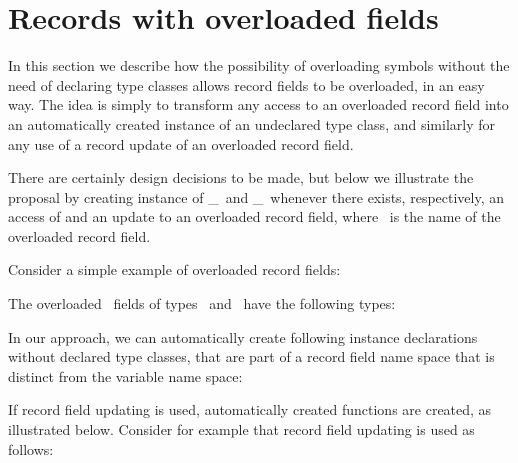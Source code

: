 \section{Records with overloaded fields}
\label{sec:overloaded-record-fields}

In this section we describe how the possibility of overloading symbols
without the need of declaring type classes allows record fields to be
overloaded, in an easy way. The idea is simply to transform any access
to an overloaded record field into an automatically created instance
of an undeclared type class, and similarly for any use of a record
update of an overloaded record field. 

There are certainly design decisions to be made, but below we
illustrate the proposal by creating instance of \get\_\fieldname\ and
\update\_\fieldname\ whenever there exists, respectively, an access of
and an update to an overloaded record field, where \fieldname\ is the
name of the overloaded record field.

Consider a simple example of overloaded record fields: 

\progb{\data\ \Address\ \= = \Address\ \= \{ \id\ :: \Int, \address\ \= :: \String\ \= \kill
\data\ \Person\  \> = \Person\  \> \{ \id\ :: \Int, \name\    \> :: \String\ \>\}\\
\data\ \Address\ \> = \Address\ \> \{ \id\ :: \Int, \address\ \> :: \String\ \>\}
}

The overloaded \id\ fields of types \Person\ and \Address\ have the
following types:

\progb{\id\ :: \Address\ \= \kill
\id\ :: \Person\  \>$\rightarrow$ \Int\\
\id\ :: \Address\ \>$\rightarrow$ \Int
}

In our approach, we can automatically create following instance
declarations without declared type classes, that are part of a record
field name space that is distinct from the variable name space:


If record field updating is used, automatically created functions are
created, as illustrated below. Consider for example that record field
updating is used as follows:


